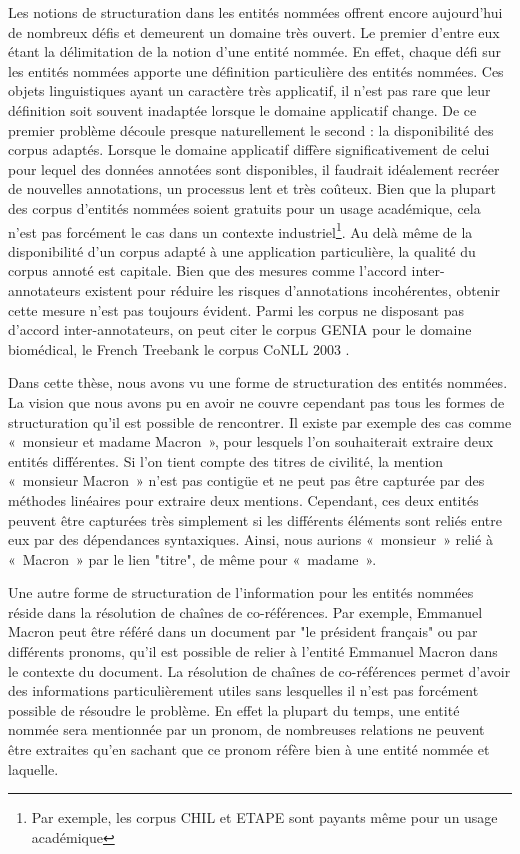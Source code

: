 \documentclass[12pt,a4paper,times,twoside,openright]{report}
\begin{document}
Les notions de structuration dans les entités nommées offrent encore aujourd'hui de nombreux défis et demeurent un domaine très ouvert. Le premier d'entre eux étant la délimitation de la notion d'une entité nommée. En effet, chaque défi sur les entités nommées apporte une définition particulière des entités nommées. Ces objets linguistiques ayant un caractère très applicatif, il n'est pas rare que leur définition soit souvent inadaptée lorsque le domaine applicatif change. De ce premier problème découle presque naturellement le second : la disponibilité des corpus adaptés. Lorsque le domaine applicatif diffère significativement de celui pour lequel des données annotées sont disponibles, il faudrait idéalement recréer de nouvelles annotations, un processus lent et très coûteux. Bien que la plupart des corpus d'entités nommées soient gratuits pour un usage académique, cela n'est pas forcément le cas dans un contexte industriel\footnote{Par exemple, les corpus CHIL \citep{mostefa2007chil} et ETAPE \citep{gravier2012etape} sont payants même pour un usage académique}. Au delà même de la disponibilité d'un corpus adapté à une application particulière, la qualité du corpus annoté est capitale. Bien que des mesures comme l'accord inter-annotateurs existent pour réduire les risques d'annotations incohérentes, obtenir cette mesure n'est pas toujours évident. Parmi les corpus ne disposant pas d'accord inter-annotateurs, on peut citer le corpus GENIA \citep{kim2003genia} pour le domaine biomédical, le French Treebank \citep{sagot2012annotation} le corpus CoNLL 2003 \citep{tjong2003introduction}.

Dans cette thèse, nous avons vu une forme de structuration des entités nommées. La vision que nous avons pu en avoir ne couvre cependant pas tous les formes de structuration qu'il est possible de rencontrer. Il existe par exemple des cas comme «\ monsieur et madame Macron\ », pour lesquels l'on souhaiterait extraire deux entités différentes. Si l'on tient compte des titres de civilité, la mention «\ monsieur Macron\ » n'est pas contigüe et ne peut pas être capturée par des méthodes linéaires pour extraire deux mentions. Cependant, ces deux entités peuvent être capturées très simplement si les différents éléments sont reliés entre eux par des dépendances syntaxiques. Ainsi, nous aurions «\ monsieur\ » relié à «\ Macron\ » par le lien "titre", de même pour «\ madame\ ».

Une autre forme de structuration de l'information pour les entités nommées réside dans la résolution de chaînes de co-références. Par exemple, Emmanuel Macron peut être référé dans un document par "le président français" ou par différents pronoms, qu'il est possible de relier à l'entité Emmanuel Macron dans le contexte du document. La résolution de chaînes de co-références permet d'avoir des informations particulièrement utiles sans lesquelles il n'est pas forcément possible de résoudre le problème. En effet la plupart du temps, une entité nommée sera mentionnée par un pronom, de nombreuses relations ne peuvent être extraites qu'en sachant que ce pronom réfère bien à une entité nommée et laquelle.
\end{document}
